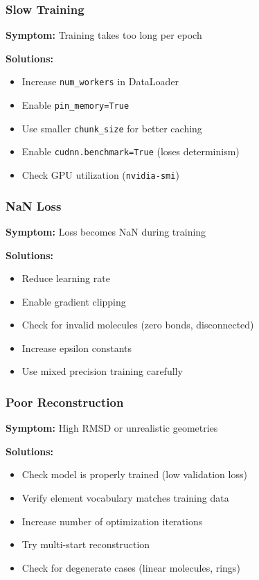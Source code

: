 \documentclass[11pt,a4paper]{article}
\begin{document}
\subsubsection{Slow Training}

\textbf{Symptom:} Training takes too long per epoch

\textbf{Solutions:}
\begin{itemize}
    \item Increase \texttt{num\_workers} in DataLoader
    \item Enable \texttt{pin\_memory=True}
    \item Use smaller \texttt{chunk\_size} for better caching
    \item Enable \texttt{cudnn.benchmark=True} (loses determinism)
    \item Check GPU utilization (\texttt{nvidia-smi})
\end{itemize}

\subsubsection{NaN Loss}

\textbf{Symptom:} Loss becomes NaN during training

\textbf{Solutions:}
\begin{itemize}
    \item Reduce learning rate
    \item Enable gradient clipping
    \item Check for invalid molecules (zero bonds, disconnected)
    \item Increase epsilon constants
    \item Use mixed precision training carefully
\end{itemize}

\subsubsection{Poor Reconstruction}

\textbf{Symptom:} High RMSD or unrealistic geometries

\textbf{Solutions:}
\begin{itemize}
    \item Check model is properly trained (low validation loss)
    \item Verify element vocabulary matches training data
    \item Increase number of optimization iterations
    \item Try multi-start reconstruction
    \item Check for degenerate cases (linear molecules, rings)
\end{itemize}
\end{document}
